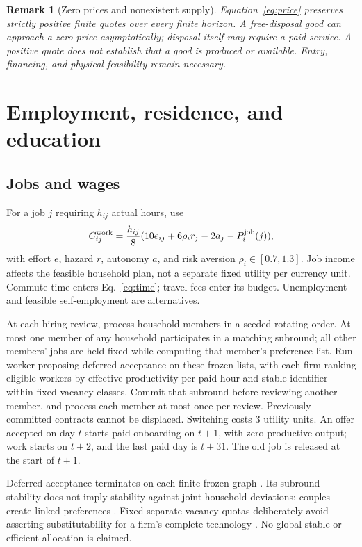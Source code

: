 \documentclass[10pt,a4paper,twocolumn]{article}
\newtheorem{remark}{Remark}
\begin{document}
\begin{remark}[Zero prices and nonexistent supply]
Equation~\eqref{eq:price} preserves strictly positive finite quotes over
every finite horizon. A free-disposal good can approach a zero price
asymptotically; disposal itself may require a paid service. A positive
quote does not establish that a good is produced or available. Entry,
financing, and physical feasibility remain necessary.
\end{remark}

\section{Employment, residence, and education}
\subsection{Jobs and wages}
For a job $j$ requiring $h_{ij}$ actual hours, use
\begin{equation}
 C^{\rm work}_{ij}=\frac{h_{ij}}8
 (10e_{ij}+6\rho_i r_j-2a_j-P_i^{\rm job}(j)),
 \label{eq:workcost}
\end{equation}
with effort $e$, hazard $r$, autonomy $a$, and risk aversion
$\rho_i\in[0.7,1.3]$. Job income affects the feasible household plan,
not a separate fixed utility per currency unit. Commute time enters
Eq.~\eqref{eq:time}; travel fees enter its budget. Unemployment and
feasible self-employment are alternatives.

At each hiring review, process household members in a seeded rotating
order. At most one member of any household participates in a matching
subround; all other members' jobs are held fixed while computing that
member's preference list. Run worker-proposing deferred acceptance on
these frozen lists, with each firm ranking eligible workers by effective
productivity per paid hour and stable identifier within fixed vacancy
classes. Commit that subround before reviewing another member, and
process each member at most once per review. Previously committed
contracts cannot be displaced. Switching costs 3 utility units.
An offer accepted on day $t$ starts paid onboarding on $t+1$, with zero
productive output; work starts on $t+2$, and the last paid day is $t+31$.
The old job is released at the start of $t+1$.

Deferred acceptance terminates on each finite frozen graph
\cite{galeshapley1962}. Its subround stability does not imply stability
against joint household deviations: couples create linked preferences
\cite{roth1984}. Fixed separate vacancy quotas deliberately avoid
asserting substitutability for a firm's complete technology
\cite{kelsocrawford1982}. No global stable or efficient allocation is claimed.
\end{document}
